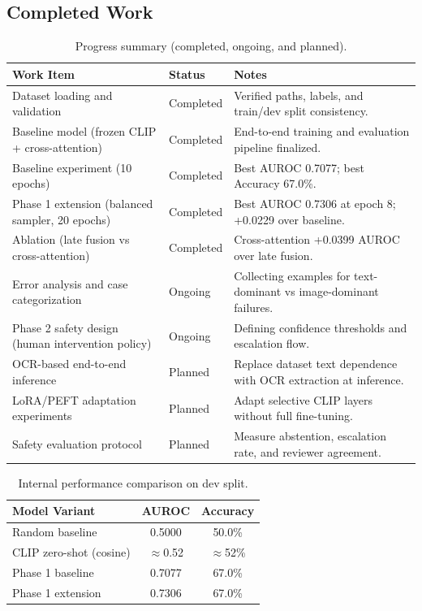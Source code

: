 \documentclass[11pt]{article}
\begin{document}
\subsection{Completed Work}
\begin{table}[t]
\centering
\small
\caption{Progress summary (completed, ongoing, and planned).}
\begin{tabularx}{\textwidth}{l l X}
\toprule
Work Item & Status & Notes \\
\midrule
Dataset loading and validation & Completed & Verified paths, labels, and train/dev split consistency. \\
Baseline model (frozen CLIP + cross-attention) & Completed & End-to-end training and evaluation pipeline finalized. \\
Baseline experiment (10 epochs) & Completed & Best AUROC 0.7077; best Accuracy 67.0\%. \\
Phase 1 extension (balanced sampler, 20 epochs) & Completed & Best AUROC 0.7306 at epoch 8; +0.0229 over baseline. \\
Ablation (late fusion vs cross-attention) & Completed & Cross-attention +0.0399 AUROC over late fusion. \\
Error analysis and case categorization & Ongoing & Collecting examples for text-dominant vs image-dominant failures. \\
Phase 2 safety design (human intervention policy) & Ongoing & Defining confidence thresholds and escalation flow. \\
OCR-based end-to-end inference & Planned & Replace dataset text dependence with OCR extraction at inference. \\
LoRA/PEFT adaptation experiments & Planned & Adapt selective CLIP layers without full fine-tuning. \\
Safety evaluation protocol & Planned & Measure abstention, escalation rate, and reviewer agreement. \\
\bottomrule
\end{tabularx}
\label{tab:progress}
\end{table}

\begin{table}[h]
\centering
\small
\caption{Internal performance comparison on dev split.}
\begin{tabular}{lcc}
\toprule
Model Variant & AUROC & Accuracy \\
\midrule
Random baseline & 0.5000 & 50.0\% \\
CLIP zero-shot (cosine) & \(\approx\)0.52 & \(\approx\)52\% \\
Phase 1 baseline & 0.7077 & 67.0\% \\
Phase 1 extension & 0.7306 & 67.0\% \\
\bottomrule
\end{tabular}
\label{tab:results}
\end{table}
\end{document}
